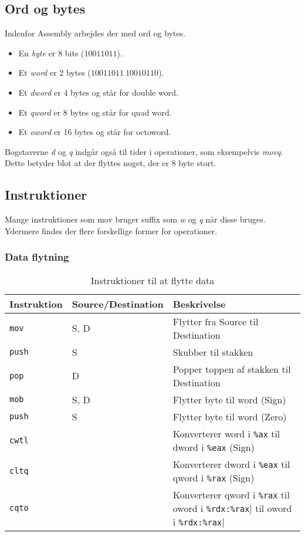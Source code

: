 \subsection{Ord og bytes}
Indenfor Assembly arbejdes der med ord og bytes.
\begin{itemize}
    \item En \textit{byte} er 8 bits ($10011011$).
    \item Et \textit{word} er 2 bytes ($10011011\:10010110$).
    \item Et \textit{dword} er 4 bytes og står for double word.
    \item Et \textit{qword} er 8 bytes og står for quad word.
    \item Et \textit{oword} er 16 bytes og står for octoword.
\end{itemize}
Bogstaverne \textit{d} og \textit{q} indgår også til tider i operationer, som eksempelvis \textit{movq}.
Dette betyder blot at der flyttes noget, der er 8 byte stort.
\subsection{Instruktioner}
Mange instruktioner som mov bruger suffix som \textit{w} og \textit{q} når disse bruges.
Ydermere findes der flere forskellige former for operationer.
\subsubsection{Data flytning}
\begin{table}[h]
    \centering
    \begin{tabular}{ll|l}
        Instruktion&Source/Destination&Beskrivelse\\\hline
        \verb|mov|&S, D&Flytter fra Source til Destination\\
        \verb|push|&S&Skubber til stakken\\
        \verb|pop|&D&Popper toppen af stakken til Destination\\\hline
        \verb|mob|&S, D&Flytter byte til word (Sign)\\
        \verb|push|&S&Flytter byte til word (Zero)\\\hline
        \verb|cwtl|&&Konverterer word i \verb|%ax| til dword i \verb|%eax| (Sign)\\
        \verb|cltq|&&Konverterer dword i \verb|%eax| til qword i \verb|%rax| (Sign)\\
        \verb|cqto|&&Konverterer qword i \verb|%rax| til oword i \verb|%rdx:%rax|
    \end{tabular}
    \caption{Instruktioner til at flytte data}
\end{table}
